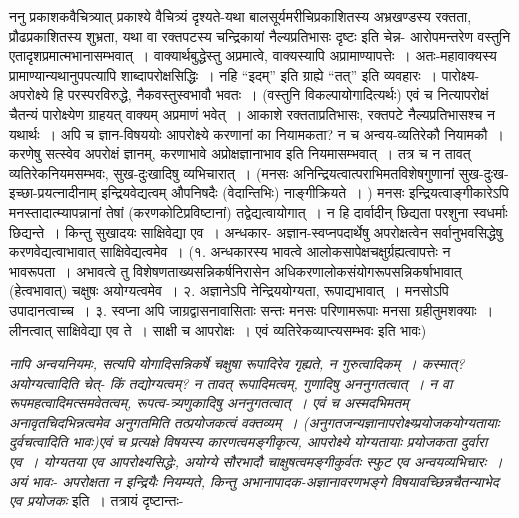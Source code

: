 {ननु प्रकाशकवैचित्र्यात् प्रकाश्ये वैचित्र्यं दृश्यते-यथा बालसूर्यमरीचिप्रकाशितस्य अभ्रखण्डस्य रक्तता, प्रौढप्रकाशितस्य शुभ्रता, यथा वा रक्तपटस्य चन्द्रिकायां नैल्यप्रतिभासः दृष्टः इति चेन्न- आरोपमन्तरेण वस्तुनि एतादृशप्रमात्मभानासम्भवात्~। वाक्यार्थबुद्धेस्तु अप्रमात्वे, वाक्यस्यापि अप्रामाण्यापत्तेः~। अतः-महावाक्यस्य प्रामाण्यान्यथानुपपत्यापि शाब्दापरोक्षसिद्धिः~। नहि “इदम्” इति ग्राह्ये “तत्” इति व्यवहारः~। पारोक्ष्य-अपरोक्ष्ये हि परस्परविरुद्धे, नैकवस्तुस्वभावौ भवतः~। (वस्तुनि विकल्पायोगादित्यर्थः) एवं च नित्यापरोक्षं चैतन्यं पारोक्ष्येण ग्राहयत् वाक्यम् अप्रमाणं भवेत्~। आकाशे रक्तताप्रतिभासः, रक्तपटे नैल्यप्रतिभासश्च न यथार्थः~। अपि च ज्ञान-विषययोः आपरोक्ष्ये करणानां का नियामकता? न च अन्वय-व्यतिरेकौ नियामकौ~। करणेषु सत्स्वेव अपरोक्षं ज्ञानम्, करणाभावे अप्रोक्षज्ञानाभाव इति नियमासम्भवात्~। तत्र च न तावत् व्यतिरेकनियमसम्भवः, सुख-दुःखादिषु व्यभिचारात्~। (मनसः अनिन्द्रियत्वात्पराभिमतविशेषगुणानां सुख-दुःख-इच्छा-प्रयत्नादीनाम् इन्द्रियवेद्यत्वम् औपनिषदैः (वेदान्तिभिः) नाङ्गीक्रियते~। ) मनसः इन्द्रियत्वाङ्गीकारेऽपि मनस्तादात्म्यापन्नानां तेषां (करणकोटिप्रविष्टानां) तद्वेद्यत्वायोगात्~। न हि दार्वादीन् छिद्यता परशुना स्वधर्माः छिद्यन्ते~। किन्तु सुखादयः साक्षिवेद्या एव~। अन्धकार- अज्ञान-स्वप्नपदार्थेषु  अपरोक्षत्वेन सर्वानुभवसिद्धेषु करणवेद्यत्वाभावात् साक्षिवेद्यत्वमेव~। (१. अन्धकारस्य भावत्वे आलोकसापेक्षचक्षुर्ग्रह्यत्वापत्तेः न भावरूपता~। अभावत्वे तु विशेषणताख्यसन्निकर्षनिरासेन अधिकरणालोकसंयोगरूपसन्निकर्षाभावात् (हेत्वभावात्) चक्षुषः अयोग्यत्वमेव~। २. अज्ञानेऽपि नेन्द्रिययोग्यता, रूपाद्यभावात्~। मनसोऽपि उपादानत्वाच्च~। ३. स्वप्ना अपि जाग्रद्वासनावासिताः सन्तः मनसः परिणामरूपाः मनसा ग्रहीतुमशक्याः~। लीनत्वात् साक्षिवेद्या एव ते~। साक्षी च आपरोक्षः~। एवं व्यतिरेकव्याप्त्यसम्भवः इति भावः)

\textit{नापि अन्वयनियमः, सत्यपि योगादिसन्निकर्षे चक्षुषा रूपादिरेव गृह्यते, न गुरुत्वादिकम्~। कस्मात्? अयोग्यत्वादिति चेत्- किं तद्योग्यत्वम्? न तावत् रूपादिमत्वम्, गुणादिषु अननुगतत्वात्~। न वा रूपमहत्वादिमत्समवेतत्वम्, रूपत्व-त्र्यणुकादिषु अननुगतत्वात्~। एवं च अस्मदभिमतम् अनावृतचिदभिन्नत्वमेव अनुगतमिति तत्प्रयोजकत्वं वक्तव्यम्~। (अनुगतजन्यज्ञानापरोक्ष्य्प्रयोजकयोग्यतायाः दुर्वचत्वादिति भावः)एवं च प्रत्यक्षे विषयस्य कारणत्वमङ्गीकृत्य, आपरोक्ष्ये योग्यतायाः प्रयोजकता दुर्वारा एव~। योग्यतया एव आपरोक्ष्यसिद्धेः, अयोग्ये सौरभादौ चाक्षुषत्वमङ्गीकुर्वतः स्फुट एव अन्वयव्यभिचारः~। अयं भावः- अपरोक्षता न इन्द्रियैः नियम्यते, किन्तु अभानापादक-अज्ञानावरणभङ्गे विषयावच्छिन्नचैतन्याभेद एव प्रयोजकः} इति~। तत्रायं दृष्टान्तः-

}
